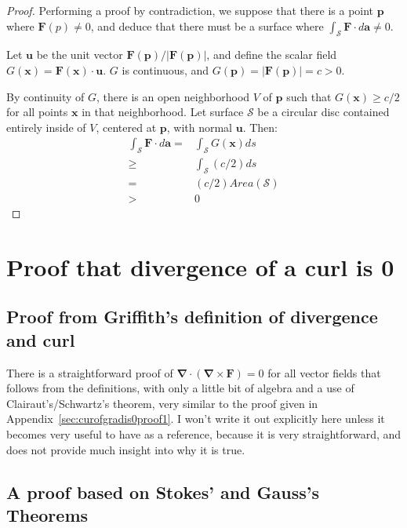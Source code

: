 \documentclass[a4paper]{article}
\theoremstyle{plain}
\theoremstyle{definition}
\newcommand{\vect}[1]{\textbf{#1}}
\newcommand{\del}{\bm{\nabla}}
\begin{document}
\begin{proof}
Performing a proof by contradiction, we suppose that there is a point
$\vect{p}$ where $\vect{F}(p) \neq 0$, and deduce that there must be a
surface where $\int_{\mathcal{S}} \vect{F} \cdot d\vect{a} \neq 0$.

Let $\vect{u}$ be the unit vector
$\vect{F}(\vect{p}) / |\vect{F}(\vect{p})|$,
and define the scalar field
$G(\vect{x}) = \vect{F}(\vect{x}) \cdot \vect{u}$.
$G$ is continuous, and $G(\vect{p}) = |\vect{F}(\vect{p})| = c > 0$.

By continuity of $G$, there is an open neighborhood $V$ of $\vect{p}$
such that $G(\vect{x}) \geq c/2$ for all points $\vect{x}$ in that neighborhood.
Let surface $\mathcal{S}$ be a circular disc contained entirely
inside of $V$, centered at $\vect{p}$, with normal $\vect{u}$.
Then:
\begin{align*}
\int_{\mathcal{S}} \vect{F} \cdot d\vect{a}
     = & \int_{\mathcal{S}} G(\vect{x}) ds \\
  \geq & \int_{\mathcal{S}} (c/2) ds \\
     = & (c/2) Area(\mathcal{S}) \\
     > & 0
\end{align*}
\end{proof}


\section{Proof that divergence of a curl is 0}
\label{sec:divofcurlis0}

\subsection{Proof from Griffith's definition of divergence and curl}

There is a straightforward proof of $\del \cdot (\del \times \vect{F})
= 0$ for all vector fields that follows from the definitions, with
only a little bit of algebra and a use of Clairaut's/Schwartz's
theorem, very similar to the proof given in
Appendix~\ref{sec:curofgradis0proof1}.  I won't write it out
explicitly here unless it becomes very useful to have as a reference,
because it is very straightforward, and does not provide much insight
into why it is true.


\subsection{A proof based on Stokes' and Gauss's Theorems}
\end{document}
